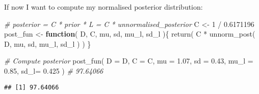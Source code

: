 \documentclass[
]{article}
\newenvironment{Shaded}{\begin{snugshade}}{\end{snugshade}}
\newcommand{\AttributeTok}[1]{\textcolor[rgb]{0.77,0.63,0.00}{#1}}
\newcommand{\CommentTok}[1]{\textcolor[rgb]{0.56,0.35,0.01}{\textit{#1}}}
\newcommand{\ControlFlowTok}[1]{\textcolor[rgb]{0.13,0.29,0.53}{\textbf{#1}}}
\newcommand{\DecValTok}[1]{\textcolor[rgb]{0.00,0.00,0.81}{#1}}
\newcommand{\FloatTok}[1]{\textcolor[rgb]{0.00,0.00,0.81}{#1}}
\newcommand{\FunctionTok}[1]{\textcolor[rgb]{0.00,0.00,0.00}{#1}}
\newcommand{\NormalTok}[1]{#1}
\newcommand{\OtherTok}[1]{\textcolor[rgb]{0.56,0.35,0.01}{#1}}
\newcommand{\SpecialCharTok}[1]{\textcolor[rgb]{0.00,0.00,0.00}{#1}}
\begin{document}
If now I want to compute my normalised posterior distribution:

\begin{Shaded}
\begin{Highlighting}[]
\CommentTok{\# posterior = C * prior * L = C * unnormalised\_posterior}
\NormalTok{C  }\OtherTok{\textless{}{-}} \DecValTok{1} \SpecialCharTok{/} \FloatTok{0.6171196}
\NormalTok{post\_fun }\OtherTok{\textless{}{-}} \ControlFlowTok{function}\NormalTok{( D, C, mu, sd, mu\_l, sd\_l )\{}
  \FunctionTok{return}\NormalTok{( C }\SpecialCharTok{*} \FunctionTok{unnorm\_post}\NormalTok{( D, mu, sd, mu\_l, sd\_l ) )}
\NormalTok{\}}

\CommentTok{\# Compute posterior}
\FunctionTok{post\_fun}\NormalTok{( }\AttributeTok{D =}\NormalTok{ D, }\AttributeTok{C =}\NormalTok{ C, }\AttributeTok{mu =} \FloatTok{1.07}\NormalTok{, }\AttributeTok{sd =} \FloatTok{0.43}\NormalTok{, }\AttributeTok{mu\_l =} \FloatTok{0.85}\NormalTok{, }\AttributeTok{sd\_l=} \FloatTok{0.425}\NormalTok{ ) }\CommentTok{\# 97.64066}
\end{Highlighting}
\end{Shaded}

\begin{verbatim}
## [1] 97.64066
\end{verbatim}
\end{document}
